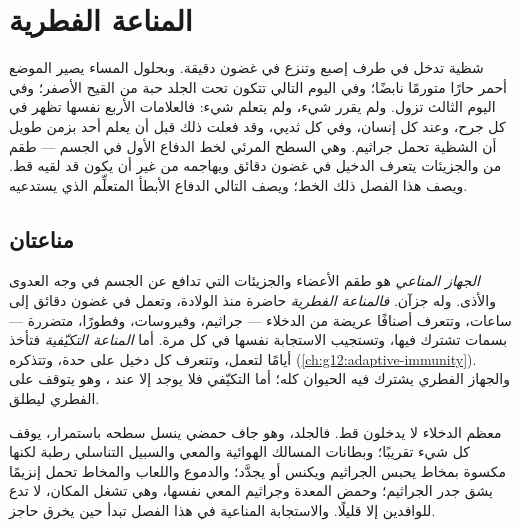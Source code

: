 \chapter{المناعة الفطرية}\label{ch:g12:innate-immunity}

شظية تدخل في طرف إصبع وتنزع في غضون دقيقة. وبحلول المساء يصير الموضع
أحمر حارًا متورمًا نابضًا؛ وفي اليوم التالي تتكون تحت الجلد حبة من القيح
الأصفر؛ وفي اليوم الثالث تزول. ولم يقرر شيء، ولم يتعلم شيء: فالعلامات
الأربع نفسها تظهر في كل جرح، وعند كل إنسان، وفي كل ثديي، وقد فعلت ذلك
قبل أن يعلم أحد بزمن طويل أن الشظية تحمل جراثيم. وهي السطح المرئي لخط
الدفاع الأول في الجسم --- طقم من  والجزيئات يتعرف الدخيل في
غضون دقائق ويهاجمه من غير أن يكون قد لقيه قط. ويصف هذا الفصل ذلك
الخط؛ ويصف التالي الدفاع الأبطأ المتعلِّم الذي يستدعيه.

\section{مناعتان}

\begin{definition}\label{def:g12:innate-immunity:immunity}
\emph{الجهاز المناعي} هو طقم الأعضاء 
والجزيئات التي تدافع عن الجسم في وجه العدوى والأذى. وله جزآن.
\emph{فالمناعة الفطرية} حاضرة منذ الولادة، وتعمل في
غضون دقائق إلى ساعات، وتتعرف أصنافًا عريضة من الدخلاء --- جراثيم،
وفيروسات، وفطورًا،  متضررة --- بسمات تشترك فيها، وتستجيب
الاستجابة نفسها في كل مرة. أما \emph{المناعة التكيّفية}
فتأخذ أيامًا لتعمل، وتتعرف كل دخيل على حدة، وتتذكره
(\cref{ch:g12:adaptive-immunity}). والجهاز الفطري يشترك فيه الحيوان
كله؛ أما التكيّفي فلا يوجد إلا عند ، وهو يتوقف على الفطري
ليطلق.
\end{definition}

\begin{proposition}\label{prop:g12:innate-immunity:barriers}
معظم الدخلاء لا يدخلون قط. فالجلد، وهو جاف حمضي ينسل سطحه باستمرار،
يوقف كل شيء تقريبًا؛ وبطانات المسالك الهوائية والمعي والسبيل التناسلي
رطبة لكنها مكسوة بمخاط يحبس الجراثيم ويكنس أو يجدَّد؛ والدموع واللعاب
والمخاط تحمل إنزيمًا يشق جدر الجراثيم؛ وحمض المعدة وجراثيم المعي نفسها،
وهي تشغل المكان، لا تدع للوافدين إلا قليلًا. والاستجابة المناعية في هذا
الفصل تبدأ حين يخرق حاجز.
\end{proposition}
\admitted

